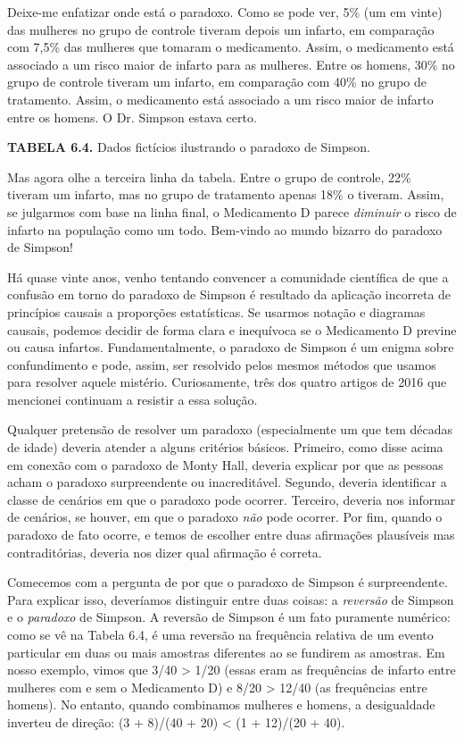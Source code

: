 \documentclass[11pt,a5paper,twoside]{book}
\begin{document}
Deixe-me enfatizar onde está o paradoxo. Como se pode ver, 5\% (um em vinte) das mulheres no grupo de controle tiveram depois um infarto, em comparação com 7,5\% das mulheres que tomaram o medicamento. Assim, o medicamento está associado a um risco maior de infarto para as mulheres. Entre os homens, 30\% no grupo de controle tiveram um infarto, em comparação com 40\% no grupo de tratamento. Assim, o medicamento está associado a um risco maior de infarto entre os homens. O Dr. Simpson estava certo.

\textbf{TABELA 6.4.} Dados fictícios ilustrando o paradoxo de Simpson.

Mas agora olhe a terceira linha da tabela. Entre o grupo de controle, 22\% tiveram um infarto, mas no grupo de tratamento apenas 18\% o tiveram. Assim, se julgarmos com base na linha final, o Medicamento D parece \textit{diminuir} o risco de infarto na população como um todo. Bem-vindo ao mundo bizarro do paradoxo de Simpson!

Há quase vinte anos, venho tentando convencer a comunidade científica de que a confusão em torno do paradoxo de Simpson é resultado da aplicação incorreta de princípios causais a proporções estatísticas. Se usarmos notação e diagramas causais, podemos decidir de forma clara e inequívoca se o Medicamento D previne ou causa infartos. Fundamentalmente, o paradoxo de Simpson é um enigma sobre confundimento e pode, assim, ser resolvido pelos mesmos métodos que usamos para resolver aquele mistério. Curiosamente, três dos quatro artigos de 2016 que mencionei continuam a resistir a essa solução.

Qualquer pretensão de resolver um paradoxo (especialmente um que tem décadas de idade) deveria atender a alguns critérios básicos. Primeiro, como disse acima em conexão com o paradoxo de Monty Hall, deveria explicar por que as pessoas acham o paradoxo surpreendente ou inacreditável. Segundo, deveria identificar a classe de cenários em que o paradoxo pode ocorrer. Terceiro, deveria nos informar de cenários, se houver, em que o paradoxo \textit{não} pode ocorrer. Por fim, quando o paradoxo de fato ocorre, e temos de escolher entre duas afirmações plausíveis mas contraditórias, deveria nos dizer qual afirmação é correta.

Comecemos com a pergunta de por que o paradoxo de Simpson é surpreendente. Para explicar isso, deveríamos distinguir entre duas coisas: a \textit{reversão} de Simpson e o \textit{paradoxo} de Simpson. A reversão de Simpson é um fato puramente numérico: como se vê na Tabela 6.4, é uma reversão na frequência relativa de um evento particular em duas ou mais amostras diferentes ao se fundirem as amostras. Em nosso exemplo, vimos que 3/40 > 1/20 (essas eram as frequências de infarto entre mulheres com e sem o Medicamento D) e 8/20 > 12/40 (as frequências entre homens). No entanto, quando combinamos mulheres e homens, a desigualdade inverteu de direção: (3 + 8)/(40 + 20) < (1 + 12)/(20 + 40).
\end{document}

